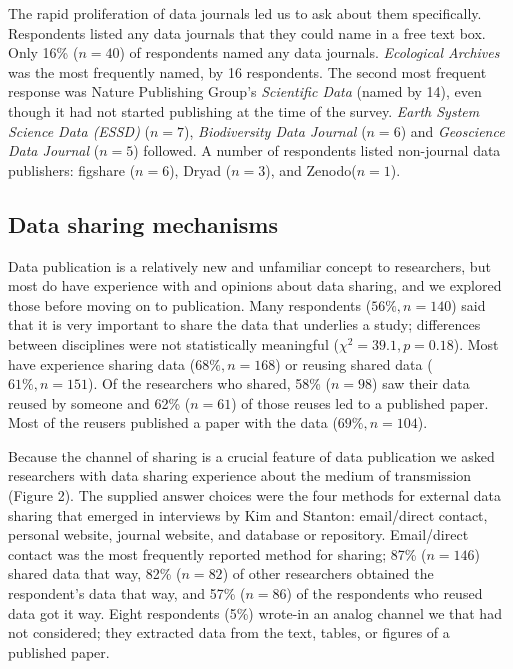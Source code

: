 \documentclass[10pt]{article}
\begin{document}
The rapid proliferation of data journals led us to ask about them specifically.
Respondents listed any data journals that they could name in a free text box.
Only 16\% ($n=40$) of respondents named any data journals. 
\emph{Ecological Archives} was the most frequently named, by 16 respondents. 
The second most frequent response was Nature Publishing Group's \emph{Scientific Data} (named by 14), even though it had not started publishing at the time of the survey.
\emph{Earth System Science Data (ESSD)} ($n=7$), \emph{Biodiversity Data Journal} ($n=6$) and \emph{Geoscience Data Journal} ($n=5$) followed.
A number of respondents listed non-journal data publishers: figshare ($n=6$), Dryad ($n=3$), and Zenodo($n=1$).

\subsection*{Data sharing mechanisms}

Data publication is a relatively new and unfamiliar concept to researchers, but most do have experience with and opinions about data sharing, and we explored those before moving on to publication.
Many respondents ($56\%, n=140$) said that it is very important to share the data that underlies a study; differences between disciplines were not statistically meaningful ($\chi^{2}= 39.1, p= 0.18$). %
Most have experience sharing data ($68\%, n=168$) or reusing shared data ($61\%, n=151$).
Of the researchers who shared, 58\% ($n=98$) saw their data reused by someone and 62\% ($n=61$) of those reuses led to a published paper.
Most of the reusers published a paper with the data ($69\%, n=104$).

Because the channel of sharing is a crucial feature of data publication\cite{kratz_data_2014} we asked researchers with data sharing experience about the medium of transmission (Figure 2).
The supplied answer choices were the four methods for external data sharing that emerged in interviews by Kim and Stanton\cite{kim_institutional_2012}: email/direct contact, personal website, journal website, and database or repository.
Email/direct contact was the most frequently reported method for sharing; 87\% ($n=146$) shared data that way, 82\% ($n=82$) of other researchers obtained the respondent's data that way, and 57\% ($n=86$) of the respondents who reused data got it way.
Eight respondents (5\%) wrote-in an analog channel we that had not considered; they extracted data from the text, tables, or figures of a published paper.
\end{document}
